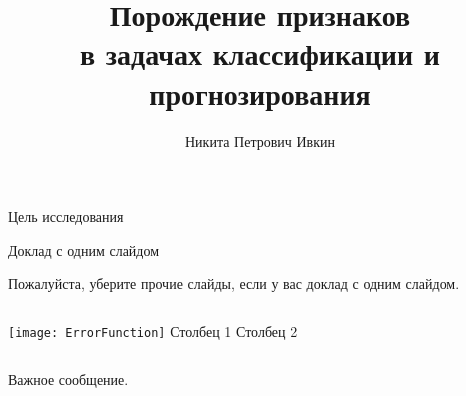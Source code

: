 \documentclass{beamer}
\title[\hbox to 56mm{Порождение признаков}]{Порождение признаков \\ в задачах классификации и прогнозирования}
\author[Н.\,П. Ивкин]{Никита Петрович Ивкин}
\institute{Московский физико-технический институт}
\date{\footnotesize
\par\smallskip\emph{Курс:} Автоматизация научных исследований\par (практика, В.\,В.~Стрижов)/Группа 874
\par\smallskip\emph{Эксперт:} О.\,Н.~Петров
\par\smallskip\emph{Консультант:} Ш.\,Л.~Фоменко
\par\bigskip\small 2021}
\begin{document}
\begin{frame}
\thispagestyle{empty}
\maketitle
\end{frame}
\begin{frame}{Цель исследования}
\end{frame}
\begin{frame}{Доклад с одним слайдом}

Пожалуйста, уберите прочие слайды, если у вас доклад с одним слайдом.

\begin{columns}[c]
\texttt{[image: ErrorFunction]}
    Столбец 1
    Столбец 2
\end{columns}

\bigskip
Важное {\color{red}сообщение}.
\end{frame}
\end{document}
